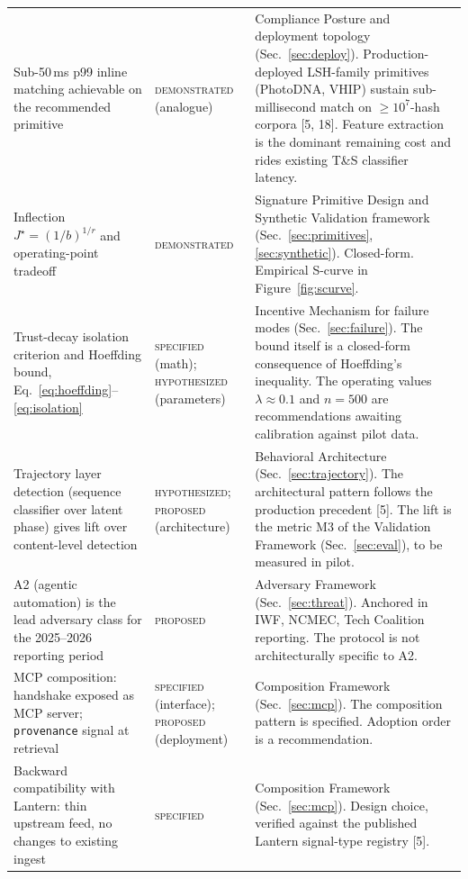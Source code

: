 \documentclass[11pt]{article}
\begin{document}
{\begin{longtable}{@{}p{4.0cm} p{2.1cm} p{8.4cm}@{}}
Sub-50\,ms p99 inline matching achievable on the recommended primitive & \textsc{demonstrated} \newline (analogue) & Compliance Posture and deployment topology (Sec.~\ref{sec:deploy}). Production-deployed LSH-family primitives (PhotoDNA, VHIP) sustain sub-millisecond match on $\geq 10^7$-hash corpora [5, 18]. Feature extraction is the dominant remaining cost and rides existing T\&S classifier latency. \\

Inflection $J^\star = (1/b)^{1/r}$ and operating-point tradeoff & \textsc{demonstrated} & Signature Primitive Design and Synthetic Validation framework (Sec.~\ref{sec:primitives}, \ref{sec:synthetic}). Closed-form. Empirical S-curve in Figure~\ref{fig:scurve}. \\

Trust-decay isolation criterion and Hoeffding bound, Eq.~\eqref{eq:hoeffding}--\eqref{eq:isolation} & \textsc{specified} \newline (math); \textsc{hypothesized} (parameters) & Incentive Mechanism for failure modes (Sec.~\ref{sec:failure}). The bound itself is a closed-form consequence of Hoeffding's inequality. The operating values $\lambda \approx 0.1$ and $n=500$ are recommendations awaiting calibration against pilot data. \\

Trajectory layer detection (sequence classifier over latent phase) gives lift over content-level detection & \textsc{hypothesized}; \textsc{proposed} (architecture) & Behavioral Architecture (Sec.~\ref{sec:trajectory}). The architectural pattern follows the production precedent [5]. The lift is the metric M3 of the Validation Framework (Sec.~\ref{sec:eval}), to be measured in pilot. \\

A2 (agentic automation) is the lead adversary class for the 2025--2026 reporting period & \textsc{proposed} & Adversary Framework (Sec.~\ref{sec:threat}). Anchored in IWF, NCMEC, Tech Coalition reporting. The protocol is not architecturally specific to A2. \\

MCP composition: handshake exposed as MCP server; \texttt{provenance} signal at retrieval & \textsc{specified} (interface); \textsc{proposed} (deployment) & Composition Framework (Sec.~\ref{sec:mcp}). The composition pattern is specified. Adoption order is a recommendation. \\

Backward compatibility with Lantern: thin upstream feed, no changes to existing ingest & \textsc{specified} & Composition Framework (Sec.~\ref{sec:mcp}). Design choice, verified against the published Lantern signal-type registry [5]. \\


\end{longtable}}
\end{document}
